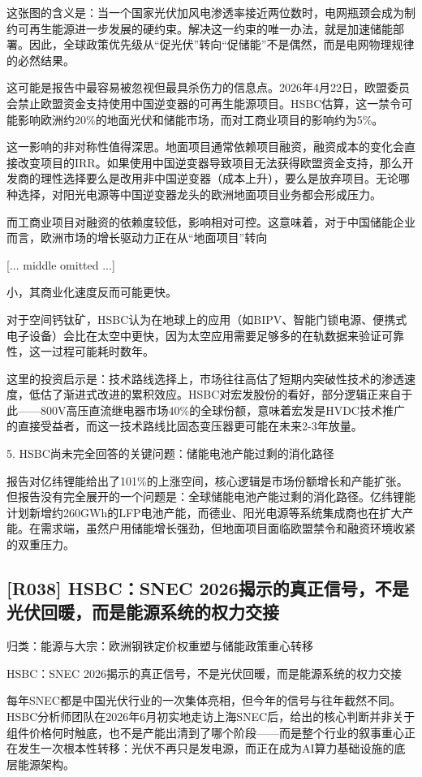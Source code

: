 \documentclass[11pt]{ctexart}
\begin{document}
这张图的含义是：当一个国家光伏加风电渗透率接近两位数时，电网瓶颈会成为制约可再生能源进一步发展的硬约束。解决这一约束的唯一办法，就是加速储能部署。因此，全球政策优先级从“促光伏”转向“促储能”不是偶然，而是电网物理规律的必然结果。

这可能是报告中最容易被忽视但最具杀伤力的信息点。2026年4月22日，欧盟委员会禁止欧盟资金支持使用中国逆变器的可再生能源项目。HSBC估算，这一禁令可能影响欧洲约20\%的地面光伏和储能市场，而对工商业项目的影响约为5\%。

这一影响的非对称性值得深思。地面项目通常依赖项目融资，融资成本的变化会直接改变项目的IRR。如果使用中国逆变器导致项目无法获得欧盟资金支持，那么开发商的理性选择要么是改用非中国逆变器（成本上升），要么是放弃项目。无论哪种选择，对阳光电源等中国逆变器龙头的欧洲地面项目业务都会形成压力。

而工商业项目对融资的依赖度较低，影响相对可控。这意味着，对于中国储能企业而言，欧洲市场的增长驱动力正在从“地面项目”转向

[... middle omitted ...]

小，其商业化速度反而可能更快。

对于空间钙钛矿，HSBC认为在地球上的应用（如BIPV、智能门锁电源、便携式电子设备）会比在太空中更快，因为太空应用需要足够多的在轨数据来验证可靠性，这一过程可能耗时数年。

这里的投资启示是：技术路线选择上，市场往往高估了短期内突破性技术的渗透速度，低估了渐进式改进的累积效应。HSBC对宏发股份的看好，部分逻辑正来自于此——800V高压直流继电器市场40\%的全球份额，意味着宏发是HVDC技术推广的直接受益者，而这一技术路线比固态变压器更可能在未来2-3年放量。

5. HSBC尚未完全回答的关键问题：储能电池产能过剩的消化路径

报告对亿纬锂能给出了101\%的上涨空间，核心逻辑是市场份额增长和产能扩张。但报告没有完全展开的一个问题是：全球储能电池产能过剩的消化路径。亿纬锂能计划新增约260GWh的LFP电池产能，而德业、阳光电源等系统集成商也在扩大产能。在需求端，虽然户用储能增长强劲，但地面项目面临欧盟禁令和融资环境收紧的双重压力。

\subsection{[R038] HSBC：SNEC 2026揭示的真正信号，不是光伏回暖，而是能源系统的权力交接}
{\small\color{refgray}归类：能源与大宗：欧洲钢铁定价权重塑与储能政策重心转移}

HSBC：SNEC 2026揭示的真正信号，不是光伏回暖，而是能源系统的权力交接

每年SNEC都是中国光伏行业的一次集体亮相，但今年的信号与往年截然不同。HSBC分析师团队在2026年6月初实地走访上海SNEC后，给出的核心判断并非关于组件价格何时触底，也不是产能出清到了哪个阶段——而是整个行业的叙事重心正在发生一次根本性转移：光伏不再只是发电源，而正在成为AI算力基础设施的底层能源架构。
\end{document}
